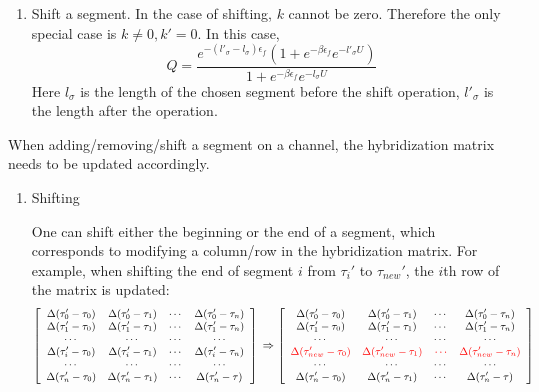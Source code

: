 \begin{enumerate}
  \item Shift a segment.
    In the case of shifting, $k$ cannot be zero. Therefore the only special case
    is $k\neq 0, k'=0$. In this case,
    \begin{equation}
      \label{eq:9}
      Q=\frac{e^{-(l'_\sigma-l_\sigma)\epsilon_f}(1+e^{-\beta\epsilon_f}e^{-l'_\sigma U})}{1+e^{-\beta\epsilon_f}e^{-l_\sigma U}}
    \end{equation}
    Here $l_\sigma$ is the length of the chosen segment before the shift 
    operation, $l'_\sigma$ is the length after the operation.


 \end{enumerate}


When adding/removing/shift a segment on a channel, the hybridization matrix
needs to be updated accordingly.
\begin{enumerate}
\item Shifting

One can shift either the beginning or the end of a segment, which corresponds to
modifying a column/row in the hybridization matrix. For example, when shifting 
the end of segment $i$ from $\tau_i'$ to ${\tau_{new}'}$, the $i$th row of the matrix is updated:
\begin{equation}
  \small
  \label{eq:hyb-matrix-shift}
  \left[
    \begin{array}{cccc}
      \Delta(\tau_0'-\tau_0) & \Delta(\tau_0'-\tau_1) & \cdots & \Delta(\tau_0'-\tau_n)\\
      \Delta(\tau_1'-\tau_0) & \Delta(\tau_1'-\tau_1) & \cdots & \Delta(\tau_1'-\tau_n)\\
      \cdots & \cdots & \cdots & \cdots \\
      \Delta(\tau_i'-\tau_0) & \Delta(\tau_i'-\tau_1) & \cdots & \Delta(\tau_i'-\tau_n)\\
      \cdots & \cdots & \cdots & \cdots \\
      \Delta(\tau_n'-\tau_0) & \Delta(\tau_n'-\tau_1) & \cdots & \Delta(\tau_n'-\tau)\\
    \end{array}
  \right]\\
\Rightarrow
  \left[
    \begin{array}{cccc}
      \Delta(\tau_0'-\tau_0) & \Delta(\tau_0'-\tau_1) & \cdots & \Delta(\tau_0'-\tau_n)\\
      \Delta(\tau_1'-\tau_0) & \Delta(\tau_1'-\tau_1) & \cdots & \Delta(\tau_1'-\tau_n)\\
      \cdots & \cdots & \cdots & \cdots \\
      \textcolor{red}{\Delta({\tau_{new}'}-\tau_0)} & \textcolor{red}{\Delta({\tau_{new}'}-\tau_1)} & \textcolor{red}{\cdots} & \textcolor{red}{\Delta(\tau_{new}'-\tau_n)}\\
      \cdots & \cdots & \cdots & \cdots \\
      \Delta(\tau_n'-\tau_0) & \Delta(\tau_n'-\tau_1) & \cdots & \Delta(\tau_n'-\tau)\\
    \end{array}
  \right]
\end{equation}


\end{enumerate}
